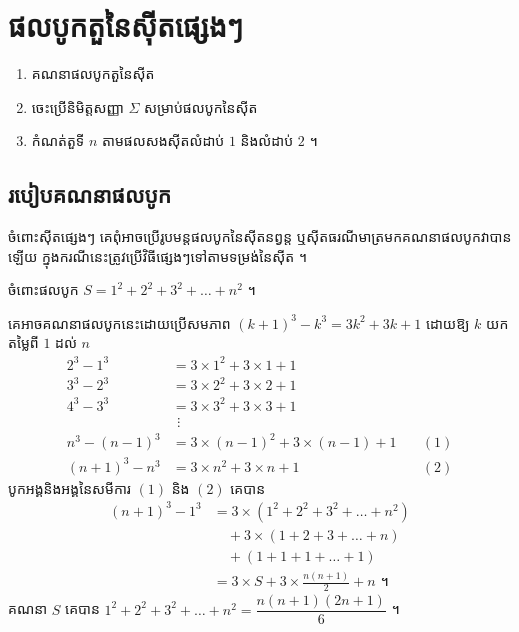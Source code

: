 \chapter{ផលបូកតួនៃស៊ីតផ្សេងៗ}

\begin{objBox}[វត្ថុបំណង]
\begin{enumerate}[1]
  \item គណនាផលបូកតួនៃស៊ីត
  \item ចេះប្រើនិមិត្តសញ្ញា $\Sigma$ សម្រាប់ផលបូកនៃស៊ីត
  \item កំណត់តួទី $n$ តាមផលសងស៊ីតលំដាប់ $1$ និងលំដាប់ $2$ ។
\end{enumerate}
\end{objBox}

\section{របៀបគណនាផលបូក}

ចំពោះស៊ីតផ្សេងៗ គេពុំអាចប្រើរូបមន្តផលបូកនៃស៊ីតនព្វន្ត ឬស៊ីតធរណីមាត្រមកគណនាផលបូកវាបានឡើយ ក្នុងករណីនេះត្រូវប្រើវិធីផ្សេងៗទៅតាមទម្រង់នៃស៊ីត ។

\begin{example}[ឧទាហរណ៍ ១]
ចំពោះផលបូក $S = 1^2 + 2^2 + 3^2 + \ldots + n^2$ ។

គេអាចគណនាផលបូកនេះដោយប្រើសមភាព $(k+1)^3 - k^3 = 3k^2 + 3k + 1$ ដោយឱ្យ $k$ យកតម្លៃពី $1$ ដល់ $n$
\[
\begin{aligned}
2^3 - 1^3 &= 3 \times 1^2 + 3 \times 1 + 1\\
3^3 - 2^3 &= 3 \times 2^2 + 3 \times 2 + 1\\
4^3 - 3^3 &= 3 \times 3^2 + 3 \times 3 + 1\\
&\ \,\vdots\\
n^3 - (n-1)^3 &= 3 \times (n-1)^2 + 3 \times (n-1) + 1 &\quad (1)\\
(n+1)^3 - n^3 &= 3 \times n^2 + 3 \times n + 1 &\quad (2)
\end{aligned}
\]
បូកអង្គនិងអង្គនៃសមីការ $(1)$ និង $(2)$ គេបាន
\[
\begin{aligned}
(n+1)^3 - 1^3 &= 3 \times (1^2 + 2^2 + 3^2 + \ldots + n^2)\\
&\quad + 3 \times (1 + 2 + 3 + \ldots + n)\\
&\quad + (1 + 1 + 1 + \ldots + 1)\\
&= 3 \times S + 3 \times \frac{n(n+1)}{2} + n \text{ ។}
\end{aligned}
\]
គណនា $S$ គេបាន $1^2 + 2^2 + 3^2 + \ldots + n^2 = \dfrac{n(n+1)(2n+1)}{6}$ ។
\end{example}

